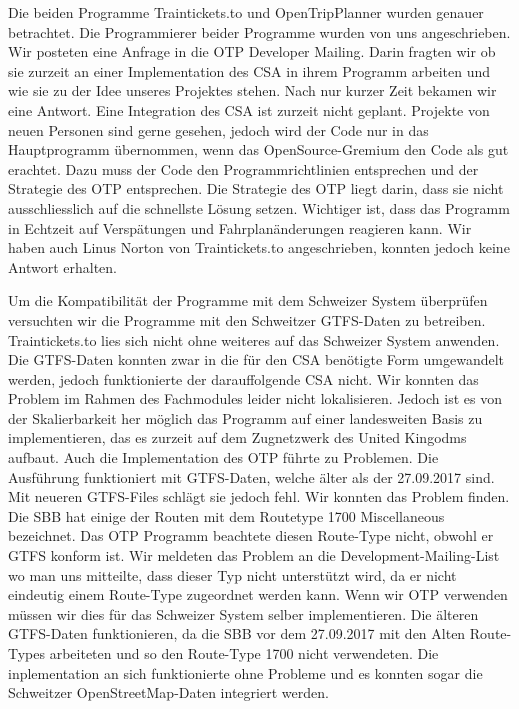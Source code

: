 Die beiden Programme Traintickets.to und OpenTripPlanner wurden genauer betrachtet. Die Programmierer beider Programme wurden von uns angeschrieben. Wir posteten eine Anfrage in die OTP Developer Mailing. Darin fragten wir ob sie zurzeit an einer Implementation des CSA in ihrem Programm arbeiten und wie sie zu der Idee unseres Projektes stehen. Nach nur kurzer Zeit bekamen wir eine Antwort. Eine Integration des CSA ist zurzeit nicht geplant. Projekte von neuen Personen sind gerne gesehen, jedoch wird der Code nur in das Hauptprogramm übernommen, wenn  das OpenSource-Gremium den Code als gut erachtet. Dazu muss der Code den Programmrichtlinien entsprechen und der Strategie des OTP entsprechen. Die Strategie des OTP liegt darin, dass sie nicht ausschliesslich auf die schnellste Lösung setzen. Wichtiger ist, dass das Programm in Echtzeit auf Verspätungen und Fahrplanänderungen reagieren kann. Wir haben auch Linus Norton von Traintickets.to angeschrieben, konnten jedoch keine Antwort erhalten. 

Um die Kompatibilität der Programme mit dem Schweizer System überprüfen versuchten wir die Programme mit den Schweitzer GTFS-Daten zu betreiben. Traintickets.to lies sich nicht ohne weiteres auf das Schweizer System anwenden. Die GTFS-Daten konnten zwar in die für den CSA benötigte Form umgewandelt werden, jedoch funktionierte der darauffolgende CSA nicht. Wir konnten das Problem im Rahmen des Fachmodules leider nicht lokalisieren. Jedoch ist es von der Skalierbarkeit her möglich das Programm auf einer landesweiten Basis zu implementieren, das es zurzeit auf dem Zugnetzwerk des United Kingodms aufbaut. Auch die Implementation des OTP führte zu Problemen. Die Ausführung funktioniert mit GTFS-Daten, welche älter als der 27.09.2017 sind. Mit neueren GTFS-Files schlägt sie jedoch fehl. Wir konnten das Problem finden. Die SBB hat einige der Routen mit dem Routetype 1700 Miscellaneous bezeichnet. Das OTP Programm beachtete diesen Route-Type nicht, obwohl er GTFS konform ist. Wir meldeten das Problem an die Development-Mailing-List wo man uns mitteilte, dass dieser Typ nicht unterstützt wird, da er nicht eindeutig einem Route-Type zugeordnet werden kann. Wenn wir OTP verwenden müssen wir dies für das Schweizer System selber implementieren. Die älteren GTFS-Daten funktionieren, da die SBB vor dem 27.09.2017 mit den Alten Route-Types arbeiteten und so den Route-Type 1700 nicht verwendeten. Die inplementation an sich funktionierte ohne Probleme und es konnten sogar die Schweitzer OpenStreetMap-Daten integriert werden.

